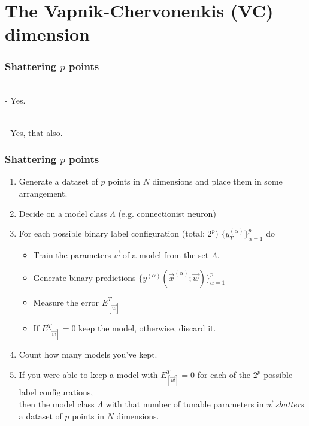 \section{The Vapnik-Chervonenkis (VC) dimension}\label{seq:dvc}


\begin{frame}\frametitle{Shattering $p$ points}

\\

- Yes.%


\\


- Yes, that also.%

\end{frame}

\begin{frame}\frametitle{Shattering $p$ points}

\begin{enumerate}
\item Generate a dataset of $p$ points in $N$ dimensions and place them in some arrangement.
\pause
\item Decide on a model class $\Lambda$ (e.g. connectionist neuron)
\pause
\item For each possible binary label configuration (total: $2^p$) $\{y_T^{(\alpha)}\}_{\alpha=1}^p$ do
	\begin{itemize}
	\item[] Train the parameters $\vec w$ of a model from the set $\Lambda$.
	\item[] Generate binary predictions $\{y^{(\alpha)}(\vec x^{(\alpha)}; \vec w)\}_{\alpha=1}^p$
	\item[] Measure the error $E^T_{[\vec w]}$
	\item[] If $E^T_{[\vec w]} = 0$ keep the model, otherwise, discard it. 
	\end{itemize}
\item Count how many models you've kept.\\
\pause
\item[] If you were able to keep a model with $E^T_{[\vec w]} = 0$ for each of the $2^p$ possible label configurations,\\
then the model class $\Lambda$ with that number of tunable parameters in $\vec w$ \emph{shatters} a dataset of $p$ points in $N$ dimensions.
\end{enumerate}

\end{frame}

